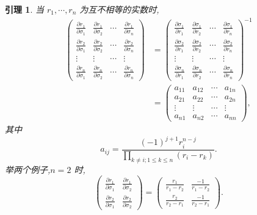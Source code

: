 \documentclass[a4paper]{article}
\newtheorem{lemma}{引理}[section]
\newcommand{\pa}{\partial} \newcommand{\Om}{\Omega}
\begin{document}
    \begin{lemma}
      当 $r_1,\cdots,r_n$ 为互不相等的实数时,
      \begin{eqnarray}
        \begin{pmatrix}
          \frac{\pa r_1}{\pa \sigma_1}&\frac{\pa r_1}{\pa
            \sigma_2}&\cdots&\frac{\pa
            r_1}{\pa \sigma_n}\\
          \frac{\pa r_2}{\pa \sigma_1}&\frac{\pa r_2}{\pa
            \sigma_2}&\cdots&\frac{\pa
            r_2}{\pa \sigma_n}\\
          \vdots&\vdots&\cdots&\vdots\\
          \frac{\pa r_n}{\pa \sigma_1}&\frac{\pa r_n}{\pa
            \sigma_2}&\cdots&\frac{\pa r_n}{\pa \sigma_n}
        \end{pmatrix}&=\begin{pmatrix} \frac{\pa \sigma_1}{\pa
            r_1}&\frac{\pa\sigma_1}{\pa r_2}&\cdots&\frac{\pa
            \sigma_1}{\pa r_n}\\
          \frac{\pa \sigma_2}{\pa r_1}&\frac{\pa \sigma_2}{\pa
            r_2}&\cdots&\frac{\pa
            \sigma_2}{\pa r_n}\\
          \vdots&\vdots&\cdots&\vdots\\
          \frac{\pa \sigma_n}{\pa r_1}&\frac{\pa\sigma_n}{\pa
            r_2}&\cdots&\frac{\pa \sigma_n}{\pa r_n}
        \end{pmatrix}^{-1}\\&=\begin{pmatrix}
          a_{11}&a_{12}&\cdots &a_{1n}\\
          a_{21}&a_{22}&\cdots&a_{2n}\\
          \vdots&\vdots&\cdots&\vdots\\
          a_{n1}&a_{n2}&\cdots&a_{nn}
        \end{pmatrix},
      \end{eqnarray}
      其中
$$
a_{ij}=\frac{(-1)^{j+1}r_i^{n-j}}{\prod_{k\neq i;1\leq k\leq
    n}(r_i-r_k)}.
$$
举两个例子,$n=2$ 时,
$$
\begin{pmatrix}
  \frac{\pa r_1}{\pa \sigma_1}&\frac{\pa r_1}{\pa \sigma_2}\\
  \frac{\pa r_2}{\pa \sigma_1}&\frac{\pa r_2}{\pa \sigma_2}
\end{pmatrix}=\begin{pmatrix}
  \frac{r_1}{r_1-r_2}&\frac{-1}{r_1-r_2}\\
  \frac{r_2}{r_2-r_1}&\frac{-1}{r_2-r_1}
\end{pmatrix}.
$$
\end{lemma}
\end{document}
